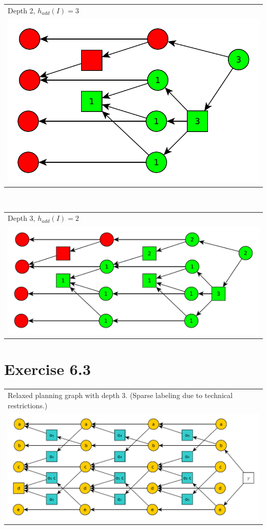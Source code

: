 \documentclass[11pt,a4paper]{article}
\begin{document}
\begin{tabular}{l} %
Depth 2, $h_{add}(I)=3$\\
\includegraphics[scale=0.5]{g622}\\
\end{tabular}\\

\begin{tabular}{l} %
Depth 3, $h_{add}(I)=2$\\
\includegraphics[scale=0.5]{g621}\\
\end{tabular}

\section*{Exercise 6.3}
\begin{tabular}{l} %
Relaxed planning graph with depth 3. (Sparse labeling due to technical restrictions.)\\
\includegraphics[scale=0.5]{g63}\\
\end{tabular}
\end{document}
